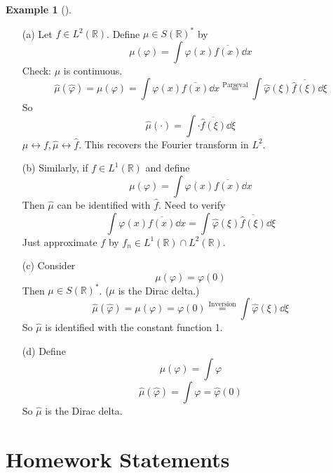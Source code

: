 \documentclass{article}
\theoremstyle{definition}
\newtheorem{ex}{Example}
\newenvironment{exs}[1][]{%
  \begin{ex}[#1]$ $\par\nobreak\ignorespaces
}{%
  \end{ex}
}
\newcommand{\RR}{\mathbb R}
\begin{document}
\begin{exs}
	\begin{enumerate}
		\item[(a)] Let $f \in L^2(\RR)$.
			Define $\mu \in S(\RR)^*$ by 
			\[
				\mu(\varphi) = \int \varphi(x) \overline{f(x)} \dd{x}
			\]
			Check: $\mu$ is continuous.
			\[
				\widehat{\mu}(\widehat{\varphi}) = \mu(\varphi) = \int \varphi(x) \overline{f(x)} \dd{x} \stackrel{\text{Parseval}}{=} \int \widehat{\varphi}(\xi) \overline{\widehat{f}(\xi)} \dd{\xi}
			\]
			So 
			\[
				\widehat{\mu}(\cdot) = \int \cdot \overline{\widehat{f}(\xi)} \dd{\xi}
			\]
			$\mu \leftrightarrow f, \widehat{\mu} \leftrightarrow \widehat{f}$.
			This recovers the Fourier transform in $L^2$.

		\item[(b)] Similarly, if $f \in L^1(\RR)$ and define 
			\[
				\mu(\varphi) = \int \varphi(x) \overline{f(x)} \dd{x}
			\]
			Then $\widehat{\mu}$ can be identified with $\widehat{f}$.
			Need to verify
			\[
				\int \varphi(x) \overline{f(x)} \dd{x} = \int \widehat{\varphi}(\xi) \overline{\widehat{f}(\xi)} \dd{\xi}
			\]
			Just approximate $f$ by $f_n \in L^1(\RR) \cap L^2(\RR)$.
			
		\item[(c)] Consider 
			\[
				\mu(\varphi) = \varphi(0)
			\]
			Then $\mu \in S(\RR)^*$. 
			($\mu$ is the Dirac delta.)
			\[
				\widehat{\mu}(\widehat{\varphi}) = \mu(\varphi) = \varphi(0) \stackrel{\text{Inversion}}{=} \int \widehat{\varphi}(\xi) \dd{\xi}
			\]
			So $\widehat{\mu}$ is identified with the constant function 1.

		\item[(d)] Define 
			\[
				\mu(\varphi) = \int \varphi
			\]
			\[
				\widehat{\mu}(\widehat{\varphi}) = \int \varphi = \widehat{\varphi}(0)
			\]
			So $\widehat{\mu}$ is the Dirac delta.
	\end{enumerate}
\end{exs}

\newpage

\section{Homework Statements}
\end{document}
